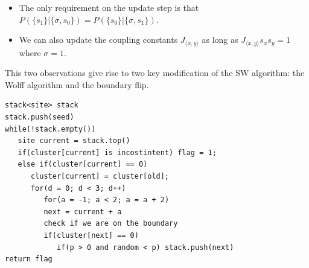 \documentclass[12pt,handout]{beamer}
\begin{document}
\begin{frame}
\begin{center}

{\large
\begin{itemize}

\item The only requirement on the update step is that  $P \left( \lbrace s_1 \rbrace | \lbrace \sigma, s_0 \rbrace \right) = P \left( \lbrace s_0 \rbrace | \lbrace \sigma, s_1 \rbrace \right)$.
\item We can also update the coupling constants $J_{\langle x, y \rangle}$ as long as $J_{\langle x, y \rangle} s_x s_y = 1$ where $\sigma = 1$.

\end{itemize}}

\vspace{30pt}

This two observations give rise to two key modification of the SW algorithm: the Wolff algorithm and the boundary flip.

\end{center}
\end{frame}


\begin{frame}[fragile]

\begin{verbatim}
stack<site> stack
stack.push(seed)
while(!stack.empty())
   site current = stack.top()
   if(cluster[current] is incostintent) flag = 1;
   else if(cluster[current] == 0)
      cluster[current] = cluster[old];
      for(d = 0; d < 3; d++) 
         for(a = -1; a < 2; a = a + 2) 
         next = current + a
         check if we are on the boundary			
         if(cluster[next] == 0)
            if(p > 0 and random < p) stack.push(next)
return flag
\end{verbatim}

\end{frame}


\end{document}
